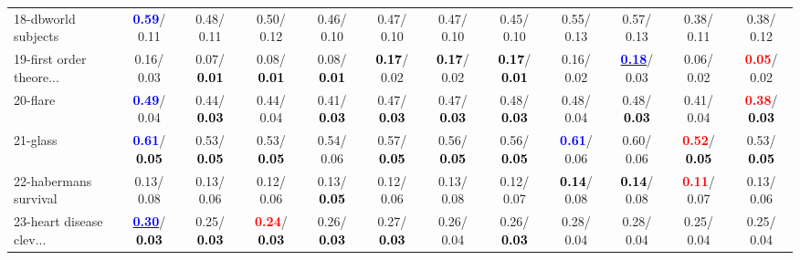 \begin{table}[h]
\begin{center}
{\begin{tabular}{lc|c|c|c|c|c|c|c|c|c|c}
18-dbworld subjects & \textcolor{blue}{\textbf{  0.59}}/  0.11 &   0.48/  0.11 &   0.50/  0.12 &   0.46/  0.10 &   0.47/  0.10 &   0.47/  0.10 &   0.45/  0.10 &   0.55/  0.13 &   0.57/  0.13 &   0.38/  0.11 &   0.38/  0.12 \\
19-first order theore... &   0.16/  0.03 &   0.07/\textcolor{black}{\textbf{  0.01}} &   0.08/\textcolor{black}{\textbf{  0.01}} &   0.08/\textcolor{black}{\textbf{  0.01}} & \textcolor{black}{\textbf{  0.17}}/  0.02 & \textcolor{black}{\textbf{  0.17}}/  0.02 & \textcolor{black}{\textbf{  0.17}}/\textcolor{black}{\textbf{  0.01}} &   0.16/  0.02 & \underline{\textcolor{blue}{\textbf{  0.18}}}/  0.03 &   0.06/  0.02 & \textcolor{red}{\textbf{  0.05}}/  0.02 \\
20-flare & \textcolor{blue}{\textbf{  0.49}}/  0.04 &   0.44/\textcolor{black}{\textbf{  0.03}} &   0.44/  0.04 &   0.41/\textcolor{black}{\textbf{  0.03}} &   0.47/\textcolor{black}{\textbf{  0.03}} &   0.47/\textcolor{black}{\textbf{  0.03}} &   0.48/\textcolor{black}{\textbf{  0.03}} &   0.48/  0.04 &   0.48/\textcolor{black}{\textbf{  0.03}} &   0.41/  0.04 & \textcolor{red}{\textbf{  0.38}}/\textcolor{black}{\textbf{  0.03}} \\
21-glass & \textcolor{blue}{\textbf{  0.61}}/\textcolor{black}{\textbf{  0.05}} &   0.53/\textcolor{black}{\textbf{  0.05}} &   0.53/\textcolor{black}{\textbf{  0.05}} &   0.54/  0.06 &   0.57/\textcolor{black}{\textbf{  0.05}} &   0.56/\textcolor{black}{\textbf{  0.05}} &   0.56/\textcolor{black}{\textbf{  0.05}} & \textcolor{blue}{\textbf{  0.61}}/  0.06 &   0.60/  0.06 & \textcolor{red}{\textbf{  0.52}}/\textcolor{black}{\textbf{  0.05}} &   0.53/\textcolor{black}{\textbf{  0.05}} \\ \hline
22-habermans survival &   0.13/  0.08 &   0.13/  0.06 &   0.12/  0.06 &   0.13/\textcolor{black}{\textbf{  0.05}} &   0.12/  0.06 &   0.13/  0.08 &   0.12/  0.07 & \textcolor{black}{\textbf{  0.14}}/  0.08 & \textcolor{black}{\textbf{  0.14}}/  0.08 & \textcolor{red}{\textbf{  0.11}}/  0.07 &   0.13/  0.06 \\
23-heart disease clev... & \underline{\textcolor{blue}{\textbf{  0.30}}}/\textcolor{black}{\textbf{  0.03}} &   0.25/\textcolor{black}{\textbf{  0.03}} & \textcolor{red}{\textbf{  0.24}}/\textcolor{black}{\textbf{  0.03}} &   0.26/\textcolor{black}{\textbf{  0.03}} &   0.27/\textcolor{black}{\textbf{  0.03}} &   0.26/  0.04 &   0.26/\textcolor{black}{\textbf{  0.03}} &   0.28/  0.04 &   0.28/  0.04 &   0.25/  0.04 &   0.25/  0.04 \\

\end{tabular}}
\end{center}
\end{table}
